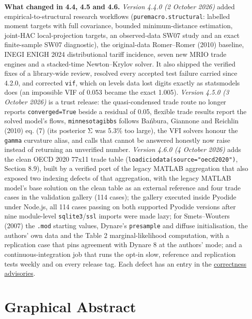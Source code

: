 \documentclass[11pt,letterpaper]{article}
\renewenvironment{quote}{\begin{tcolorbox}[colback=lightslate,colframe=cardborder,boxrule=0.6pt,
  arc=3mm,left=10pt,right=10pt,top=6pt,bottom=6pt,breakable]}{\end{tcolorbox}}
\newcounter{none} %
\renewcommand{\_}{\pmunderscore\allowbreak}
\begin{document}
\begin{quote}
\textbf{What changed in 4.4, 4.5 and 4.6.} \emph{Version 4.4.0 (2 October 2026)} added empirical-to-structural research workflows (\texttt{puremacro.structural}: labelled moment targets with full covariance, bounded minimum-distance estimation, joint-HAC local-projection targets, an observed-data SW07 study and an exact finite-sample SW07 diagnostic), the original-data Romer--Romer (2010) baseline, INEGI ENIGH 2024 distributional tariff incidence, seven new MRIO trade engines and a stacked-time Newton--Krylov solver. It also shipped the verified fixes of a library-wide review, resolved every accepted test failure carried since 4.2.0, and corrected \texttt{vif}, which on levels data lost digits exactly as statsmodels does (an impossible VIF of 0.053 became the exact 1.005). \emph{Version 4.5.0 (3 October 2026)} is a trust release: the quasi-condensed trade route no longer reports \texttt{converged=True} beside a residual of 0.05, flexible trade results report the solved model's flows, \texttt{minnesota\_gibbs} follows Bańbura, Giannone and Reichlin (2010) eq. (7) (its posterior Σ was 5.3\% too large), the VFI solvers honour the \texttt{gamma} curvature alias, and calls that cannot be answered honestly now raise instead of returning an unverified number. \emph{Version 4.6.0 (4 October 2026)} adds the clean OECD 2020 77x11 trade table (\texttt{load\_icio\_data(source="oecd2020")}, Section 8.9), built by a verified port of the legacy MATLAB aggregation that also exposed two indexing defects of that aggregation, with the legacy MATLAB model's base solution on the clean table as an external reference and four trade cases in the validation gallery (114 cases); the gallery executed inside Pyodide under Node.js, all 114 cases passing on both supported Pyodide versions after nine module-level \texttt{sqlite3}/\texttt{ssl} imports were made lazy; for Smets--Wouters (2007) the \texttt{.mod} starting values, Dynare's \texttt{presample} and diffuse initialisation, the authors' own data and the Table 2 marginal-likelihood computation, with a replication case that pins agreement with Dynare 8 at the authors' mode; and a continuous-integration job that runs the opt-in slow, reference and replication tests weekly and on every release tag. Each defect has an entry in the \href{https://github.com/jalonso1979/puremacro/blob/v4.6.0/docs/ADVISORY.md}{correctness advisories}.
\end{quote}

\clearpage
\section*{Graphical Abstract}\label{graphical-abstract}
\end{document}
